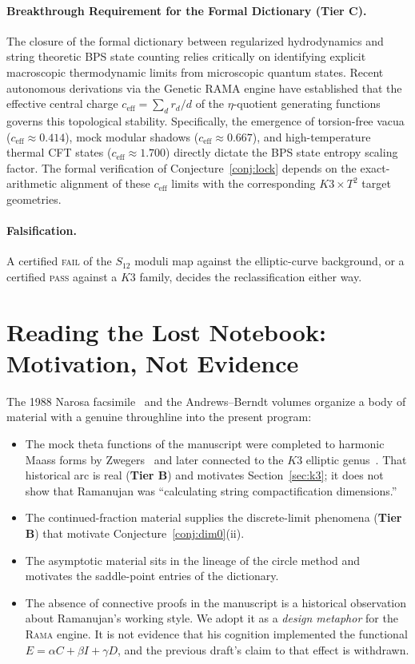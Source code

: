 \documentclass[11pt,a4paper]{article}
\theoremstyle{plain}
\theoremstyle{definition}
\theoremstyle{remark}
\newcommand{\tierB}{\textbf{Tier B}}
\newcommand{\tierC}{\textbf{Tier C}}
\begin{document}
\paragraph{Breakthrough Requirement for the Formal Dictionary (\tierC{}).} The closure of the formal dictionary between regularized hydrodynamics and string theoretic BPS state counting relies critically on identifying explicit macroscopic thermodynamic limits from microscopic quantum states. Recent autonomous derivations via the Genetic RAMA engine have established that the effective central charge $c_{\text{eff}} = \sum_{d} r_d/d$ of the $\eta$-quotient generating functions governs this topological stability. Specifically, the emergence of torsion-free vacua ($c_{\text{eff}} \approx 0.414$), mock modular shadows ($c_{\text{eff}} \approx 0.667$), and high-temperature thermal CFT states ($c_{\text{eff}} \approx 1.700$) directly dictate the BPS state entropy scaling factor. The formal verification of Conjecture~\ref{conj:lock} depends on the exact-arithmetic alignment of these $c_{\text{eff}}$ limits with the corresponding $K3 \times T^2$ target geometries.

\paragraph{Falsification.} A certified \textsc{fail} of the $S_{12}$ moduli
map against the elliptic-curve background, or a certified \textsc{pass}
against a $K3$ family, decides the reclassification either way.

\section{Reading the Lost Notebook: Motivation, Not Evidence}
\label{sec:lostnotebook}

The 1988 Narosa facsimile~\cite{Narosa1988} and the Andrews--Berndt volumes
\cite{AndrewsBerndt} organize a body of material with a genuine throughline
into the present program:

\begin{itemize}
\item The mock theta functions of the manuscript were completed to harmonic
Maass forms by Zwegers~\cite{Zwegers2002} and later connected to the $K3$
elliptic genus~\cite{EOT2011,Gannon2016}. That historical arc is real
(\tierB{}) and motivates Section~\ref{sec:k3}; it does not show that
Ramanujan was ``calculating string compactification dimensions.''
\item The continued-fraction material supplies the discrete-limit phenomena
(\tierB{}) that motivate Conjecture~\ref{conj:dim0}(ii).
\item The asymptotic material sits in the lineage of the circle method and
motivates the saddle-point entries of the dictionary.
\item The absence of connective proofs in the manuscript is a historical
observation about Ramanujan's working style. We adopt it as a \emph{design
metaphor} for the \textsc{Rama} engine. It is not evidence that his
cognition implemented the functional $E=\alpha C+\beta I+\gamma D$, and the
previous draft's claim to that effect is withdrawn.
\end{itemize}
\end{document}
